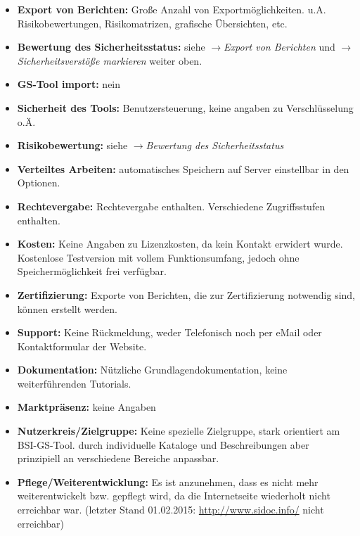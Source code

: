 \begin{itemize}
\item \textbf{Export von Berichten:} Große Anzahl von Exportmöglichkeiten. u.A. Risikobewertungen, Risikomatrizen, grafische Übersichten, etc.
\item \textbf{Bewertung des Sicherheitsstatus:} siehe $\rightarrow$\textit{Export von Berichten} und $\rightarrow$\textit{Sicherheitsverstöße markieren} weiter oben.
\item \textbf{GS-Tool import:} nein
\item \textbf{Sicherheit des Tools:} Benutzersteuerung, keine angaben zu Verschlüsselung o.Ä.
\item \textbf{Risikobewertung:} siehe $\rightarrow$\textit{Bewertung des Sicherheitsstatus}
\item \textbf{Verteiltes Arbeiten:} automatisches Speichern auf Server einstellbar in den Optionen.
\item \textbf{Rechtevergabe:} Rechtevergabe enthalten. Verschiedene Zugriffsstufen enthalten.
\item \textbf{Kosten:} Keine Angaben zu Lizenzkosten, da kein Kontakt erwidert wurde. Kostenlose Testversion mit vollem Funktionsumfang, jedoch ohne Speichermöglichkeit frei verfügbar.
\item \textbf{Zertifizierung:} Exporte von Berichten, die zur Zertifizierung notwendig sind, können erstellt werden.
\item \textbf{Support:} Keine Rückmeldung, weder Telefonisch noch per eMail oder Kontaktformular der Website.
\item \textbf{Dokumentation:} Nützliche Grundlagendokumentation, keine weiterführenden Tutorials.
\item \textbf{Marktpräsenz:} keine Angaben
\item \textbf{Nutzerkreis/Zielgruppe:} Keine spezielle Zielgruppe, stark orientiert am BSI-GS-Tool. durch individuelle Kataloge und Beschreibungen aber prinzipiell an verschiedene Bereiche anpassbar.
\item \textbf{Pflege/Weiterentwicklung:} Es ist anzunehmen, dass es nicht mehr weiterentwickelt bzw. gepflegt wird, da die Internetseite wiederholt nicht erreichbar war. (letzter Stand 01.02.2015: \url{http://www.sidoc.info/} nicht erreichbar)

\end{itemize}




